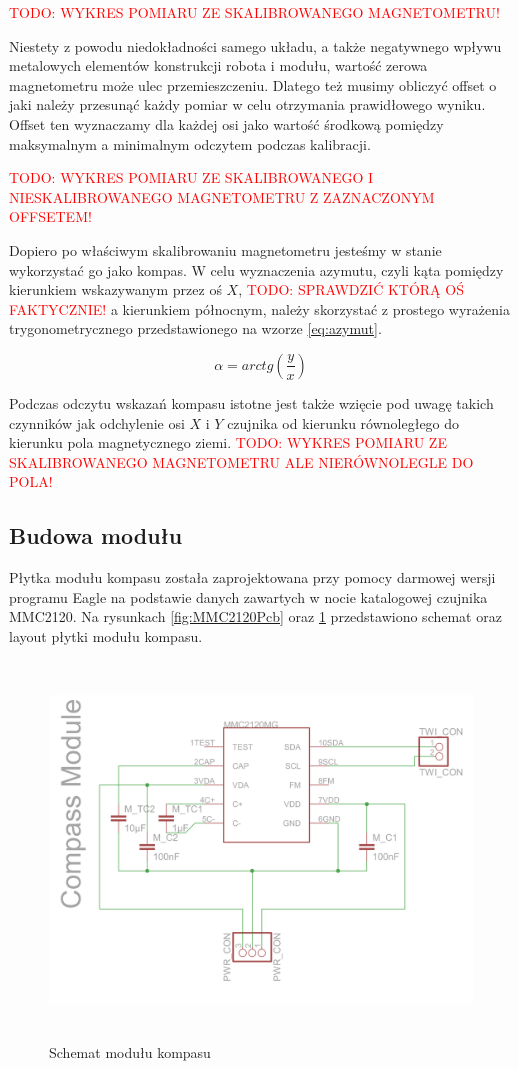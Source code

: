 \textcolor{red}{TODO: WYKRES POMIARU ZE SKALIBROWANEGO MAGNETOMETRU!}

Niestety z powodu niedokładności samego układu, a także negatywnego wpływu metalowych elementów konstrukcji robota i modułu, wartość zerowa magnetometru może ulec przemieszczeniu. Dlatego też musimy obliczyć offset o jaki należy przesunąć każdy pomiar w celu otrzymania prawidłowego wyniku. Offset ten wyznaczamy dla każdej osi jako wartość środkową pomiędzy maksymalnym a minimalnym odczytem podczas kalibracji.

\textcolor{red}{TODO: WYKRES POMIARU ZE SKALIBROWANEGO I NIESKALIBROWANEGO MAGNETOMETRU Z ZAZNACZONYM OFFSETEM!}

Dopiero po właściwym skalibrowaniu magnetometru jesteśmy w stanie wykorzystać go jako kompas. W celu wyznaczenia azymutu, czyli kąta pomiędzy kierunkiem wskazywanym przez oś $X$, \textcolor{red}{TODO: SPRAWDZIĆ KTÓRĄ OŚ FAKTYCZNIE!} a kierunkiem północnym, należy skorzystać z prostego wyrażenia trygonometrycznego przedstawionego na wzorze \ref{eq:azymut}.

\begin{equation}
  \label{eq:azymut}
  \alpha = arctg \left( \frac{y}{x} \right)
\end{equation}

Podczas odczytu wskazań kompasu istotne jest także wzięcie pod uwagę takich czynników jak odchylenie osi $X$ i $Y$ czujnika od kierunku równoległego do kierunku pola magnetycznego ziemi.
\textcolor{red}{TODO: WYKRES POMIARU ZE SKALIBROWANEGO MAGNETOMETRU ALE NIERÓWNOLEGLE DO POLA!}

\subsection{Budowa modułu}
Płytka modułu kompasu została zaprojektowana przy pomocy darmowej wersji programu Eagle na podstawie danych zawartych w nocie katalogowej czujnika MMC2120. Na rysunkach \ref{fig:MMC2120Pcb} oraz \ref{fig:MMC2120Sch} przedstawiono schemat oraz layout płytki modułu kompasu.

\begin{figure}[!ht]
 \centering
 \includegraphics[height=100mm]{../images/ch04/mmc2120mgsch.png}
 \caption{Schemat modułu kompasu}
 \label{fig:MMC2120Sch}
\end{figure}

